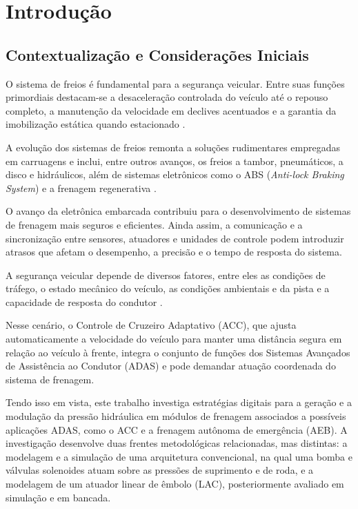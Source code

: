 \chapter{Introdução}
\label{cap:introducao}

\section{Contextualização e Considerações Iniciais}
\label{chap:introducao-1}
 
O sistema de freios é fundamental para a segurança veicular. Entre suas funções primordiais destacam-se a desaceleração controlada do veículo até o repouso completo, a manutenção da velocidade em declives acentuados e a garantia da imobilização estática quando estacionado \cite{Rudolf2011}.

A evolução dos sistemas de freios remonta a soluções rudimentares empregadas em carruagens e inclui, entre outros avanços, os freios a tambor, pneumáticos, a disco e hidráulicos, além de sistemas eletrônicos como o ABS (\textit{Anti-lock Braking System}) e a frenagem regenerativa \cite{Konrad2014}.

O avanço da eletrônica embarcada contribuiu para o desenvolvimento de sistemas de frenagem mais seguros e eficientes. Ainda assim, a comunicação e a sincronização entre sensores, atuadores e unidades de controle podem introduzir atrasos que afetam o desempenho, a precisão e o tempo de resposta do sistema.

A segurança veicular depende de diversos fatores, entre eles as condições de tráfego, o estado mecânico do veículo, as condições ambientais e da pista e a capacidade de resposta do condutor \cite[p.~265]{Konrad2014}.

Nesse cenário, o Controle de Cruzeiro Adaptativo (ACC), que ajusta automaticamente a velocidade do veículo para manter uma distância segura em relação ao veículo à frente, integra o conjunto de funções dos Sistemas Avançados de Assistência ao Condutor (ADAS) e pode demandar atuação coordenada do sistema de frenagem.

Tendo isso em vista, este trabalho investiga estratégias digitais para a geração e a modulação da pressão hidráulica em módulos de frenagem associados a possíveis aplicações ADAS, como o ACC e a frenagem autônoma de emergência (AEB). A investigação desenvolve duas frentes metodológicas relacionadas, mas distintas: a modelagem e a simulação de uma arquitetura convencional, na qual uma bomba e válvulas solenoides atuam sobre as pressões de suprimento e de roda, e a modelagem de um atuador linear de êmbolo (LAC), posteriormente avaliado em simulação e em bancada.

